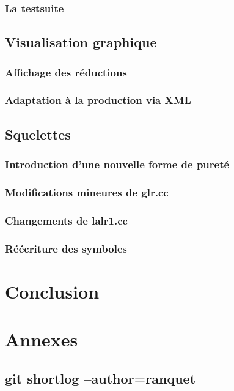 \documentclass[a4paper,11pt,twoside,final]{article}
\begin{document}
  \subsubsection{La testsuite}

  \subsection{Visualisation graphique}
  \subsubsection{Affichage des réductions}
  \subsubsection{Adaptation à la production via XML}

  \subsection{Squelettes}
  \subsubsection{Introduction d'une nouvelle forme de pureté}
  \subsubsection{Modifications mineures de glr.cc}
  \subsubsection{Changements de lalr1.cc}
  \subsubsection{Réécriture des symboles}

  \cleardoublepage
  \section{Conclusion}

  \cleardoublepage
  \section{Annexes}

  \subsection{git shortlog --author=ranquet}
  \begin{adjustwidth}{-2cm}{-2cm}
  \end{adjustwidth}

  \cleardoublepage
  \cleardoublepage
\end{document}

